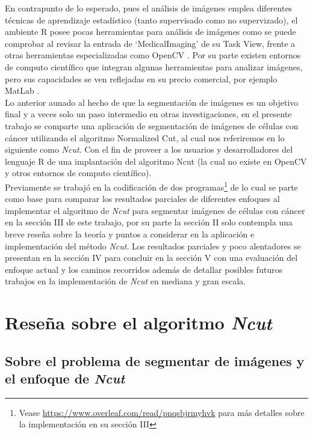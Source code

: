 \documentclass[conference]{IEEEtran}
\begin{document}
En contrapunto de lo esperado, pues el análisis de imágenes emplea diferentes técnicas de aprendizaje estadístico (tanto supervisado como no supervizado), el ambiente R posee pocas herramientas para análisis de imágenes como se puede comprobar al revisar la entrada de ‘MedicalImaging’ de su Task View,  frente a otras herramientas especializadas como OpenCV \cite{OpenCV}. Por su parte existen entornos de computo científico que integran algunas herramientas para analizar imágenes, pero sus capacidades se ven reflejadas en su precio comercial, por ejemplo MatLab \cite{MatLab}. \\

Lo anterior aunado al hecho de que la segmentación de imágenes es un objetivo final y a veces solo un paso intermedio en otras investigaciones, en el presente trabajo se comparte una aplicación de segmentación de imágenes de células con cáncer 
utilizando el algoritmo Normalized Cut, al cual nos referiremos en lo siguiente como \textit{Ncut}. Con el fin de proveer a los usuarios y desarrolladores del lenguaje R de una implantación del algoritmo Ncut (la cual no existe en OpenCV y otros entornos de computo científico). \\
Previamente se trabajó en la codificación de dos programas\footnote{Vease \url{https://www.overleaf.com/read/pnqsbjrmyhvk} para más detalles sobre la implementación en su sección III} de lo cual se parte como base para comparar los resultados parciales de diferentes enfoques al implementar el algoritmo de \textit{Ncut} para segmentar imágenes de células con cáncer en la sección III de este trabajo, por su parte la sección II solo contempla una breve reseña sobre la teoría y puntos a considerar en la aplicación e implementación del método \textit{Ncut}. Los resultados parciales y poco alentadores se presentan en la sección IV para concluir en la sección V con una evaluación del enfoque actual y los caminos recorridos además de detallar posibles futuros trabajos en la implementación de \textit{Ncut} en mediana y gran escala.\\



\section{Reseña sobre el algoritmo \textit{Ncut}}

\subsection{Sobre el problema de segmentar de imágenes y el enfoque de \textit{Ncut}}
\end{document}
